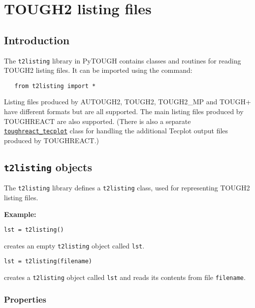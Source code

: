 \chapter{TOUGH2 listing files}
\label{listingfiles}

\section{Introduction}
The \texttt{t2listing} library in PyTOUGH contains classes and routines for reading TOUGH2 listing files.  It can be imported using the command:

\begin{lstlisting}
   from t2listing import *
\end{lstlisting}


Listing files produced by AUTOUGH2, TOUGH2, TOUGH2\_MP and TOUGH+ have different formats but are all supported.  The main listing files produced by TOUGHREACT are also supported. (There is also a separate \hyperref[toughreact_tecplot]{\texttt{toughreact\_tecplot}} class for handling the additional Tecplot output files produced by TOUGHREACT.)

\section{\texttt{t2listing} objects}

The \texttt{t2listing} library defines a \texttt{t2listing} class, used for representing TOUGH2 listing files.

\textbf{Example:}

\begin{lstlisting}
lst = t2listing()
\end{lstlisting}

creates an empty \texttt{t2listing} object called \texttt{lst}.

\begin{lstlisting}
lst = t2listing(filename)
\end{lstlisting}

creates a \texttt{t2listing} object called \texttt{lst} and reads its contents from file \texttt{filename}.

\subsection{Properties}
\label{t2listing_properties}

